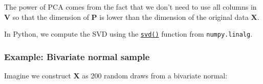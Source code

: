 \documentclass{scrartcl}
\begin{document}
The power of PCA comes from the fact that we don't need to use all
columns in \(\mathbf{V}\) so that the dimension of \(\mathbf{P}\) is
lower than the dimension of the original data \(\mathbf{X}\).

In Python, we compute the SVD using the
\href{https://numpy.org/doc/stable/reference/generated/numpy.linalg.svd.html}{\texttt{svd()}}
function from \texttt{numpy.linalg}.

    \hypertarget{example-bivariate-normal-sample}{%
\vspace{1em}\subsubsection{Example: Bivariate normal
sample}\label{example-bivariate-normal-sample}}

Imagine we construct \(\mathbf{X}\) as 200 random draws from a bivariate
normal:
\end{document}
